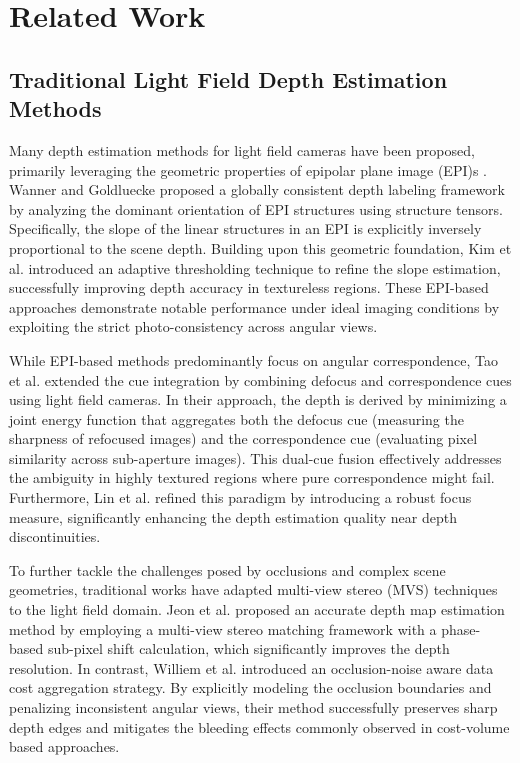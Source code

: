 \documentclass[lettersize,journal]{IEEEtran}
\begin{document}
\section{Related Work}

\subsection{Traditional Light Field Depth Estimation Methods}

Many depth estimation methods for light field cameras have been proposed, primarily leveraging the geometric properties of epipolar plane image (EPI)s \cite{epipolarepipo_15}. Wanner and Goldluecke \cite{wannerwanne} proposed a globally consistent depth labeling framework by analyzing the dominant orientation of EPI structures using structure tensors. Specifically, the slope of the linear structures in an EPI is explicitly inversely proportional to the scene depth. Building upon this geometric foundation, Kim et al. \cite{korean2025} introduced an adaptive thresholding technique to refine the slope estimation, successfully improving depth accuracy in textureless regions. These EPI-based approaches demonstrate notable performance under ideal imaging conditions by exploiting the strict photo-consistency across angular views.

While EPI-based methods predominantly focus on angular correspondence, Tao et al. \cite{taotao} extended the cue integration by combining defocus and correspondence cues using light field cameras. In their approach, the depth is derived by minimizing a joint energy function that aggregates both the defocus cue (measuring the sharpness of refocused images) and the correspondence cue (evaluating pixel similarity across sub-aperture images). This dual-cue fusion effectively addresses the ambiguity in highly textured regions where pure correspondence might fail. Furthermore, Lin et al. \cite{linlin} refined this paradigm by introducing a robust focus measure, significantly enhancing the depth estimation quality near depth discontinuities.

To further tackle the challenges posed by occlusions and complex scene geometries, traditional works have adapted multi-view stereo (MVS) techniques to the light field domain. Jeon et al. \cite{jeonjeon} proposed an accurate depth map estimation method by employing a multi-view stereo matching framework with a phase-based sub-pixel shift calculation, which significantly improves the depth resolution. In contrast, Williem et al. \cite{williemwilli} introduced an occlusion-noise aware data cost aggregation strategy. By explicitly modeling the occlusion boundaries and penalizing inconsistent angular views, their method successfully preserves sharp depth edges and mitigates the bleeding effects commonly observed in cost-volume based approaches.
\end{document}

